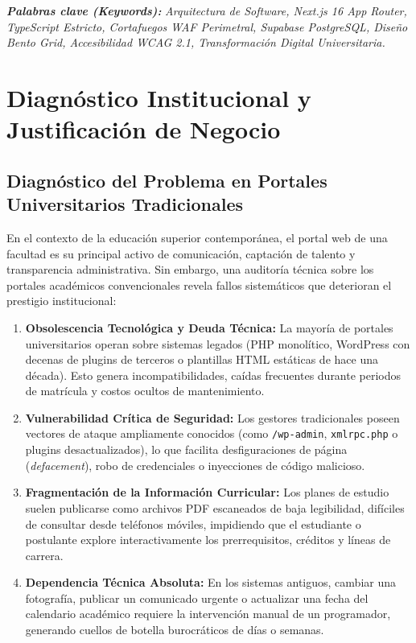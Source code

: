 \documentclass[12pt,a4paper,oneside]{report}
\begin{document}
\vspace{0.3cm}
\noindent
\textbf{\textit{Palabras clave (Keywords):}} \textit{Arquitectura de Software, Next.js 16 App Router, TypeScript Estricto, Cortafuegos WAF Perimetral, Supabase PostgreSQL, Diseño Bento Grid, Accesibilidad WCAG 2.1, Transformación Digital Universitaria.}

\newpage
\tableofcontents
\newpage
\listoftables
\newpage


\chapter{Diagnóstico Institucional y Justificación de Negocio}

\section{Diagnóstico del Problema en Portales Universitarios Tradicionales}
En el contexto de la educación superior contemporánea, el portal web de una facultad es su principal activo de comunicación, captación de talento y transparencia administrativa. Sin embargo, una auditoría técnica sobre los portales académicos convencionales revela fallos sistemáticos que deterioran el prestigio institucional:

\begin{enumerate}[label=\textbf{\arabic*.}, leftmargin=1.1cm]
  \item \textbf{Obsolescencia Tecnológica y Deuda Técnica:} La mayoría de portales universitarios operan sobre sistemas legados (PHP monolítico, WordPress con decenas de plugins de terceros o plantillas HTML estáticas de hace una década). Esto genera incompatibilidades, caídas frecuentes durante periodos de matrícula y costos ocultos de mantenimiento.
  \item \textbf{Vulnerabilidad Crítica de Seguridad:} Los gestores tradicionales poseen vectores de ataque ampliamente conocidos (como \texttt{/wp-admin}, \texttt{xmlrpc.php} o plugins desactualizados), lo que facilita desfiguraciones de página (\textit{defacement}), robo de credenciales o inyecciones de código malicioso.
  \item \textbf{Fragmentación de la Información Curricular:} Los planes de estudio suelen publicarse como archivos PDF escaneados de baja legibilidad, difíciles de consultar desde teléfonos móviles, impidiendo que el estudiante o postulante explore interactivamente los prerrequisitos, créditos y líneas de carrera.
  \item \textbf{Dependencia Técnica Absoluta:} En los sistemas antiguos, cambiar una fotografía, publicar un comunicado urgente o actualizar una fecha del calendario académico requiere la intervención manual de un programador, generando cuellos de botella burocráticos de días o semanas.
\end{enumerate}
\end{document}
